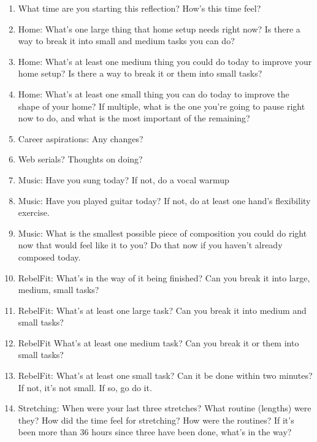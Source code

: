 \begin{enumerate}

\item What time are you starting this reflection? How's this time feel?

\item Home: What's one large thing that home setup needs right now? Is there a way to break it into small and medium tasks you can do?

\item Home: What's at least one medium thing you could do today to improve your home setup? Is there a way to break it or them into small tasks?

\item Home: What's at least one small thing you can do today to improve the shape of your home? If multiple, what is the one you're going to pause right now to do, and what is the most important of the remaining?

\item Career aspirations: Any changes?

\item Web serials? Thoughts on doing?

\item Music: Have you sung today? If not, do a vocal warmup

\item Music: Have you played guitar today? If not, do at least one hand's flexibility exercise.

\item Music: What is the smallest possible piece of composition you could do right now that would feel like it  to you? Do that now if you haven't already composed today.

\item RebelFit: What's in the way of it being finished? Can you break it into large, medium, small tasks?

\item RebelFit: What's at least one large task? Can you break it into medium and small tasks?

\item RebelFit What's at least one medium task? Can you break it or them into small tasks?

\item RebelFit: What's at least one small task? Can it be done within two minutes? If not, it's not small. If so, go do it.

\item Stretching: When were your last three stretches? What routine (lengths) were they? How did the time feel for stretching? How were the routines? If it's been more than 36 hours since three have been done, what's in the way?


\end{enumerate}
